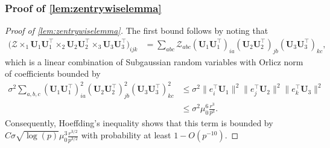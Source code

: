 \documentclass[10pt]{article}
\newcommand{\0}{{\mathbf{0}}}
\newcommand{\1}{{\mathbf{1}}}
\newcommand{\U}{{\mathbf{U}}}
\renewcommand{\t}{^{\top}}
\begin{document}
\subsubsection{Proof of \cref{lem:zentrywiselemma}}
\begin{proof}[Proof of \cref{lem:zentrywiselemma}]
The first bound follows by noting that
\begin{align*}
        \bigg( \mathcal{Z} \times_1 \U_1 \U_1\t \times_2 \U_2 \U_2\t \times_3 \U_3 \U_3\t \bigg)_{ijk}  &= \sum_{abc} \mathcal{Z}_{abc} (\U_1 \U_1\t)_{ia}(\U_2 \U_2\t)_{jb}(\U_3 \U_3\t)_{kc},
\end{align*}
which is a linear combination of Subgaussian random variables with Orlicz norm of coefficients bounded by
\begin{align*}
    \sigma^2 \sum_{a,b,c}  (\U_1 \U_1\t)_{ia}^2(\U_2 \U_2\t)_{jb}^2(\U_3 \U_3\t)_{kc}^2 &\leq \sigma^2 \| e_i\t \U_1 \|^2 \| e_j\t \U_2 \|^2 \| e_k\t \U_3 \|^2 \\
    &\leq \sigma^2 \mu_0^6 \frac{r^3}{p^3}.
\end{align*}
Consequently, Hoeffding's inequality shows that this term is bounded by $C \sigma \sqrt{\log(p)} \mu_0^3 \frac{r^{3/2}}{p^{3/2}}$ with probability at least $1 - O(p^{-10})$.  



\end{proof}
\end{document}
